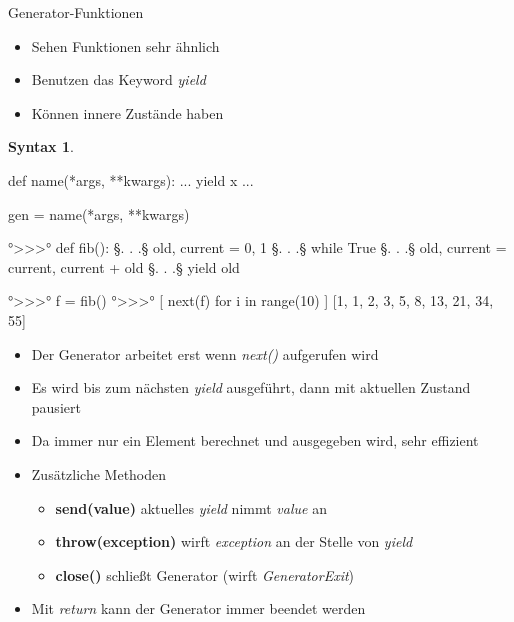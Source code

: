 \documentclass[ngerman]{beamer}
\theoremstyle{definition}
\newtheorem{syntax}{Syntax}
\begin{document}
\begin{frame}{Generator-Funktionen}
	\begin{itemize}
		\item Sehen Funktionen sehr ähnlich
		\item Benutzen das Keyword \emph{yield}
		\item Können innere Zustände haben
	\end{itemize}
	\begin{syntax}
		\begin{python}[numbers=none]
def name(*args, **kwargs):
	...
	yield x
	...
	
gen = name(*args, **kwargs)
		\end{python}
	\end{syntax}
\framebreak

\begin{example}
	\begin{python}[numbers=none]
°>>>° def fib():
§. . .§	  old, current = 0, 1
§. . .§	  while True
§. . .§	      old, current = current, current + old
§. . .§	      yield old

°>>>° f = fib()
°>>>° [ next(f) for i in range(10) ]
[1, 1, 2, 3, 5, 8, 13, 21, 34, 55]
	\end{python}
\end{example}
\framebreak

\begin{itemize}
	\item Der Generator arbeitet erst wenn \emph{next()} aufgerufen wird
	\item Es wird bis zum nächsten \emph{yield} ausgeführt, dann mit aktuellen Zustand pausiert
	\item Da immer nur ein Element berechnet und ausgegeben wird, sehr effizient
	\item Zusätzliche Methoden
	\begin{itemize}
		\item \textbf{send(value)} aktuelles \emph{yield} nimmt \emph{value} an
		\item \textbf{throw(exception)} wirft \emph{exception} an der Stelle von \emph{yield} 
		\item \textbf{close()} schließt Generator (wirft \emph{GeneratorExit})
	\end{itemize}
	\item Mit \emph{return} kann der Generator immer beendet werden
\end{itemize}

\framebreak


\end{frame}
\end{document}
